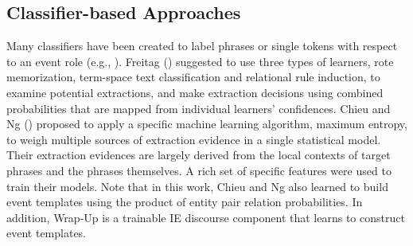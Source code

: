 \subsection{Classifier-based Approaches}

Many classifiers have been created to
label phrases or single tokens with respect to an event role (e.g.,
\cite{freitag-icml98,chieu02,finn04,li05,yu05}).
Freitag (\cite{freitag-icml98}) suggested to use 
three types of learners, rote memorization, 
term-space text classification and relational rule induction, 
to examine potential extractions, 
and make extraction decisions using combined 
probabilities that are mapped from 
individual learners' confidences. 
Chieu and Ng (\cite{chieu02}) proposed to 
apply a specific machine learning algorithm, maximum entropy, 
to weigh multiple sources of extraction evidence 
in a single statistical model. 
Their extraction evidences are largely derived from the local contexts of 
target phrases and the phrases themselves. 
A rich set of specific features were used to train their models. 
Note that in this work, Chieu and Ng also learned to 
build event templates using the product of 
entity pair relation probabilities. 
In addition, Wrap-Up \cite{soderland94} 
is a trainable IE discourse component 
that learns to construct event templates. 

